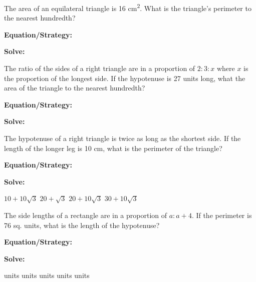 \vfill
\newpage
\begin{multicols*}{2}
\begin{outline}[enumerate]
\medium

\1 The area of an equilateral triangle is 16 cm\textsuperscript{2}. What is the triangle's perimeter to the nearest hundredth?

\bigskip
\textbf{Equation/Strategy:} \hrulefill

\bigskip
\textbf{Solve:} 

\vfill
{}

\midline

\1 The ratio of the sides of a right triangle are in a proportion of $2:3:x$ where $x$ is the proportion of the longest side. If the hypotenuse is 27 units long, what the area of the triangle to the nearest hundredth?

\bigskip
\textbf{Equation/Strategy:} \hrulefill

\bigskip
\textbf{Solve:}

\vfill
{}

\columnbreak
\advanced

\1 The hypotenuse of a right triangle is twice as long as the shortest side. If the length of the longer leg is 10 cm, what is the perimeter of the triangle?

\bigskip
\textbf{Equation/Strategy:} \hrulefill

\bigskip
\textbf{Solve:}

\vfill
\2 $10+10\sqrt{3}$
\2 $20+\sqrt{3}$
\2 $20+10\sqrt{3}$
\2 $30+10\sqrt{3}$

\midline

\1 The side lengths of a rectangle are in a proportion of $a:a+4$. If the perimeter is 76 sq. units, what is the length of the hypotenuse?

\bigskip
\textbf{Equation/Strategy:}

\bigskip
\textbf{Solve:}

\vfill
{} units
 units
 units
 units
 units
\end{outline}
\end{multicols*}